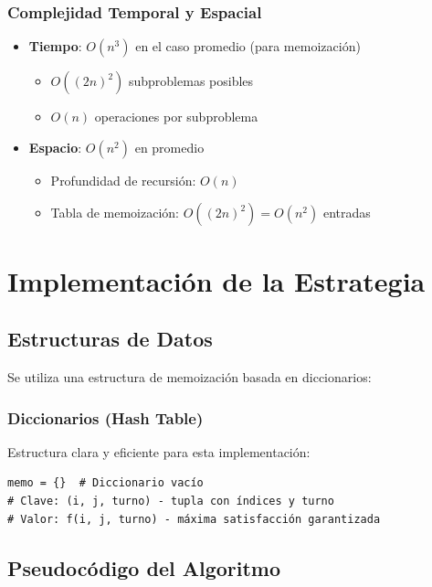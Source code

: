 \documentclass[12pt,letterpaper]{article}
\begin{document}
\subsubsection{Complejidad Temporal y Espacial}

\begin{itemize}
    \item \textbf{Tiempo}: $O(n^3)$ en el caso promedio (para memoización)
    \begin{itemize}
        \item $O((2n)^2)$ subproblemas posibles
        \item $O(n)$ operaciones por subproblema
    \end{itemize}
    \item \textbf{Espacio}: $O(n^2)$ en promedio
    \begin{itemize}
        \item Profundidad de recursión: $O(n)$
        \item Tabla de memoización: $O((2n)^2) = O(n^2)$ entradas
    \end{itemize}
\end{itemize}

\section{Implementación de la Estrategia}

\subsection{Estructuras de Datos}

Se utiliza una estructura de memoización basada en diccionarios:

\subsubsection{Diccionarios (Hash Table)}

Estructura clara y eficiente para esta implementación:

\begin{lstlisting}
memo = {}  # Diccionario vacío
# Clave: (i, j, turno) - tupla con índices y turno
# Valor: f(i, j, turno) - máxima satisfacción garantizada
\end{lstlisting}

\subsection{Pseudocódigo del Algoritmo}
\end{document}
